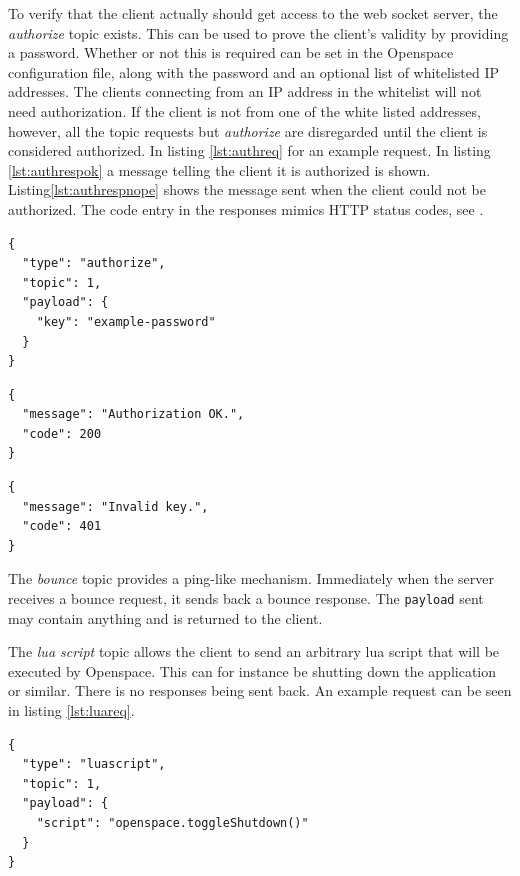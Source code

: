 To verify that the client actually should get access to the web socket server, the \emph{authorize} topic exists. This can be used to prove the client's validity by providing a password. Whether or not this is required can be set in the Openspace configuration file, along with the password and an optional list of whitelisted IP addresses. The clients connecting from an IP address in the whitelist will not need authorization. If the client is not from one of the white listed addresses, however, all the topic requests but \emph{authorize} are disregarded until the client is considered authorized. In listing \ref{lst:authreq} for an example request. In listing \ref{lst:authrespok} a message telling the client it is authorized is shown. Listing\ref{lst:authrespnope} shows the message sent when the client could not be authorized. The code entry in the responses mimics HTTP status codes, see \cite[ch. 10]{RFC2616}.

\begin{lstlisting}[caption={Example authorization request sent by the GUI},label=lst:authreq]
{
  "type": "authorize",
  "topic": 1,
  "payload": {
    "key": "example-password"
  }
}
\end{lstlisting}

\begin{lstlisting}[caption={Example authorization granted response sent by the server},label=lst:authrespok]
{
  "message": "Authorization OK.",
  "code": 200
}
\end{lstlisting}

\begin{lstlisting}[caption={Example authorization denied response sent by the server},label=lst:authrespnope]
{
  "message": "Invalid key.",
  "code": 401
}
\end{lstlisting}

The \emph{bounce} topic provides a ping-like mechanism. Immediately when the server receives a bounce request, it sends back a bounce response. The \texttt{payload} sent may contain anything and is returned to the client.

The \emph{lua script} topic allows the client to send an arbitrary lua script that will be executed by Openspace. This can for instance be shutting down the application or similar. There is no responses being sent back. An example request can be seen in listing \ref{lst:luareq}.

\begin{lstlisting}[caption={Example Lua script request sent by the GUI, toggling the shut down process in OpenSpace.},label=lst:luareq]
{
  "type": "luascript",
  "topic": 1,
  "payload": {
    "script": "openspace.toggleShutdown()"
  }
}
\end{lstlisting}

